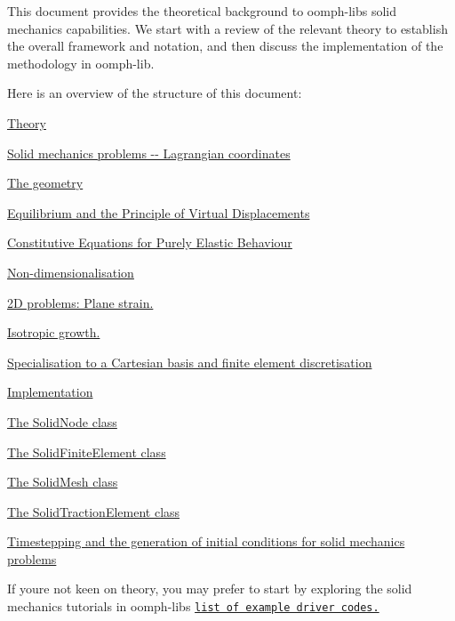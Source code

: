 This document provides the theoretical background to {\ttfamily oomph-\/lib\textquotesingle{}s} solid mechanics capabilities. We start with a review of the relevant theory to establish the overall framework and notation, and then discuss the implementation of the methodology in {\ttfamily oomph-\/lib}.

Here is an overview of the structure of this document\+:
\begin{DoxyItemize}
\item \hyperlink{index_theory}{Theory}
\begin{DoxyItemize}
\item \hyperlink{index_solids_lagrange}{Solid mechanics problems -\/-\/ Lagrangian coordinates}
\item \hyperlink{index_geometry}{The geometry}
\item \hyperlink{index_equilibrium}{Equilibrium and the Principle of Virtual Displacements}
\item \hyperlink{index_elastic_constitutive}{Constitutive Equations for Purely Elastic Behaviour}
\item \hyperlink{index_non-dim_solid}{Non-\/dimensionalisation}
\item \hyperlink{index_two_d_solid}{2D problems\+: Plane strain.}
\item \hyperlink{index_isotropic_growth}{Isotropic growth.}
\item \hyperlink{index_CartesianLagrangian}{Specialisation to a Cartesian basis and finite element discretisation}
\end{DoxyItemize}
\item \hyperlink{index_solid_implementation}{Implementation}
\begin{DoxyItemize}
\item \hyperlink{index_solid_node}{The Solid\+Node class}
\item \hyperlink{index_solid_fe}{The Solid\+Finite\+Element class}
\item \hyperlink{index_solid_mesh}{The Solid\+Mesh class}
\item \hyperlink{index_solid_traction}{The Solid\+Traction\+Element class}
\end{DoxyItemize}
\item \hyperlink{index_Solid_IC}{Timestepping and the generation of initial conditions for solid mechanics problems}
\end{DoxyItemize}If you\textquotesingle{}re not keen on theory, you may prefer to start by exploring the solid mechanics tutorials in {\ttfamily oomph-\/lib\textquotesingle{}s} \href{../../../example_code_list/html/index.html#solid}{\tt list of example driver codes.}



